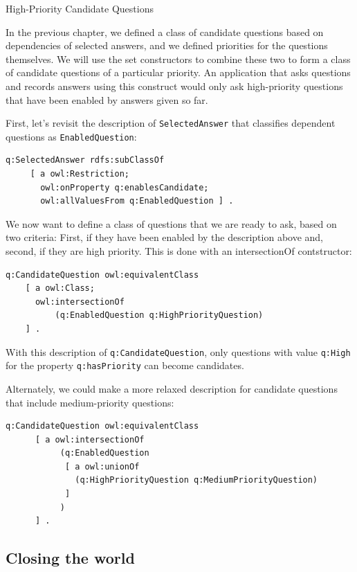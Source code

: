 \begin{example}{High-Priority Candidate Questions}

In the previous chapter, we defined a class of candidate questions based
on dependencies of selected answers, and we defined priorities for the
questions themselves. We will use the set constructors to combine these
two to form a class of candidate questions of a particular priority. An
application that asks questions and records answers using this construct
would only ask high-priority questions that have been enabled by answers
given so far.

First, let's revisit the description of \texttt{SelectedAnswer} that classifies
dependent questions as
\texttt{EnabledQuestion}:

\begin{lstlisting}
q:SelectedAnswer rdfs:subClassOf
     [ a owl:Restriction;
       owl:onProperty q:enablesCandidate;
       owl:allValuesFrom q:EnabledQuestion ] .
\end{lstlisting}

We now want to define a class of questions that we are ready to ask,
based on two criteria: First, if they have been enabled by the
description above and, second, if they are high priority. This is done
with an intersectionOf contstructor:

\begin{lstlisting}
q:CandidateQuestion owl:equivalentClass
    [ a owl:Class;
      owl:intersectionOf
          (q:EnabledQuestion q:HighPriorityQuestion)
    ] .
\end{lstlisting}

With this description of \texttt{q:CandidateQuestion}, only questions with value
\texttt{q:High} for the property
\texttt{q:hasPriority} can become candidates.

Alternately, we could make a more relaxed description for candidate
questions that include medium-priority questions:

\begin{lstlisting}
q:CandidateQuestion owl:equivalentClass
      [ a owl:intersectionOf
           (q:EnabledQuestion
            [ a owl:unionOf
              (q:HighPriorityQuestion q:MediumPriorityQuestion) 
            ]
           )
      ] .
\end{lstlisting}
\end{example}

\subsection{Closing the world}

